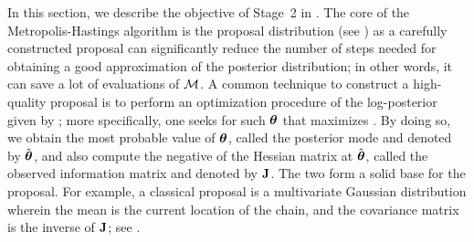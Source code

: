 In this section, we describe the objective of Stage~2 in .
The core of the Metropolis-Hastings algorithm is the proposal distribution (see ) as a carefully constructed proposal can significantly reduce the number of steps needed for obtaining a good approximation of the posterior distribution; in other words, it can save a lot of evaluations of $\model$.
A common technique to construct a high-quality proposal is to perform an optimization procedure of the log-posterior given by ; more specifically, one seeks for such ${\boldsymbol\theta}$ that maximizes .
By doing so, we obtain the most probable value of ${\boldsymbol\theta}$, called the posterior mode and denoted by $\hat{{\boldsymbol\theta}}$, and also compute the negative of the Hessian matrix at $\hat{{\boldsymbol\theta}}$, called the observed information matrix and denoted by $\mathbf{J}$. The two form a solid base for the proposal.
For example, a classical proposal is a multivariate Gaussian distribution wherein the mean is the current location of the chain, and the covariance matrix is the inverse of $\mathbf{J}$; see \cite{gelman2004, bernardo2007}.
